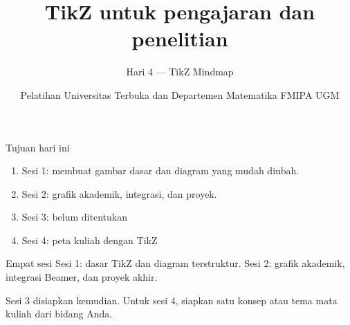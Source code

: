 \documentclass[aspectratio=169,11pt]{beamer}
\title{TikZ untuk pengajaran dan penelitian}
\subtitle{Hari 4 --- TikZ Mindmap}
\author{Pelatihan Universitas Terbuka dan Departemen Matematika FMIPA UGM}
\date{}
\begin{document}
\begin{frame}
  \maketitle
\end{frame}
\begin{frame}{Tujuan hari ini}
\begin{enumerate}
\item Sesi 1: membuat gambar dasar dan diagram yang mudah diubah.
\item Sesi 2: grafik akademik, integrasi, dan proyek.
\item Sesi 3: belum ditentukan
\item Sesi 4: peta kuliah dengan TikZ
\end{enumerate}
\end{frame}
\begin{frame}{Empat sesi}
Sesi 1: dasar TikZ dan diagram terstruktur. Sesi 2: grafik akademik, integrasi Beamer, dan proyek akhir.
\medskip

Sesi 3 disiapkan kemudian. Untuk sesi 4, siapkan satu konsep atau tema mata kuliah dari bidang Anda.
\end{frame}
\end{document}
